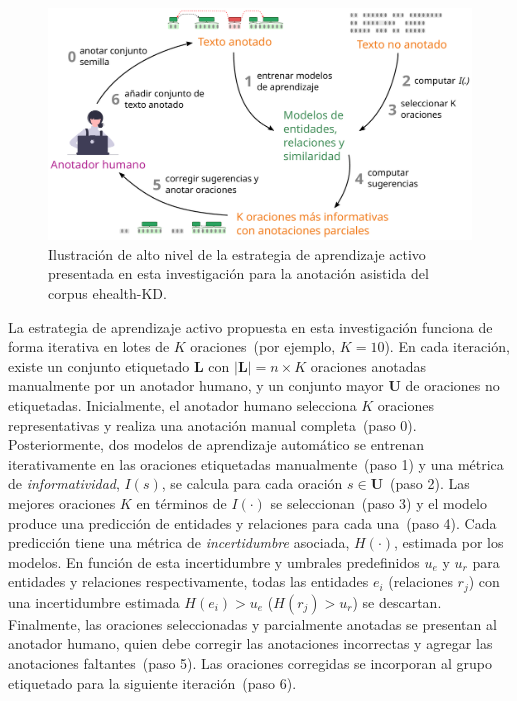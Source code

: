 \begin{figure}[htb]
    \centering
    \includegraphics[width=\textwidth]{Images/Chapters/SchemaAssistedAnnotation.pdf}
    \caption[Estrategia de aprendizaje activo.]{Ilustración de alto nivel de la estrategia de aprendizaje activo presentada en esta investigación para la anotación asistida del corpus ehealth-KD.}
    \label{fig:model}
\end{figure}

\newcommand{\Labeled}{\mathbf{L}}
\newcommand{\Unlabeled}{\mathbf{U}}
\newcommand{\infr}[1]{I(#1)}
\newcommand{\infrc}{\infr{\cdot}}
\newcommand{\unc}[1]{H(#1)}
\newcommand{\uncc}{\unc{\cdot}}
\newcommand{\id}[1]{ID(#1)}
\newcommand{\uncm}[1]{\hat{H}(#1)}
\newcommand{\unccm}{\uncm{\cdot}}

La estrategia de aprendizaje activo propuesta en esta investigación funciona de forma iterativa en lotes de $K$ oraciones~(por ejemplo, $K=10$).
En cada iteración, existe un conjunto etiquetado $\Labeled$ con $|\Labeled|=n \times K$ oraciones anotadas manualmente por un anotador humano, y un conjunto mayor  $\Unlabeled$ de oraciones no etiquetadas.
Inicialmente, el anotador humano selecciona $K$ oraciones representativas y realiza una anotación manual completa~(paso 0).
Posteriormente, dos modelos de aprendizaje automático se entrenan iterativamente en las oraciones etiquetadas manualmente~(paso 1) y una métrica de \textit{informatividad}, $\infr{s}$, se calcula para cada oración $s \in \Unlabeled$~(paso 2).
Las mejores oraciones $K$ en términos de $\infrc$ se seleccionan~(paso 3) y el modelo produce una predicción de entidades y relaciones para cada una~(paso 4).
Cada predicción tiene una métrica de \textit{incertidumbre} asociada, $\uncc$, estimada por los modelos.
En función de esta incertidumbre y umbrales predefinidos $u_e$ y $u_r$ para entidades y relaciones respectivamente, todas las entidades $e_i$ (relaciones $r_j$) con una incertidumbre estimada $\unc{e_i}>u_e$ ($\unc{r_j}>u_r$) se descartan.
Finalmente, las oraciones seleccionadas y parcialmente anotadas se presentan al anotador humano, quien debe corregir las anotaciones incorrectas y agregar las anotaciones faltantes~(paso 5).
Las oraciones corregidas se incorporan al grupo etiquetado para la siguiente iteración~(paso 6).

